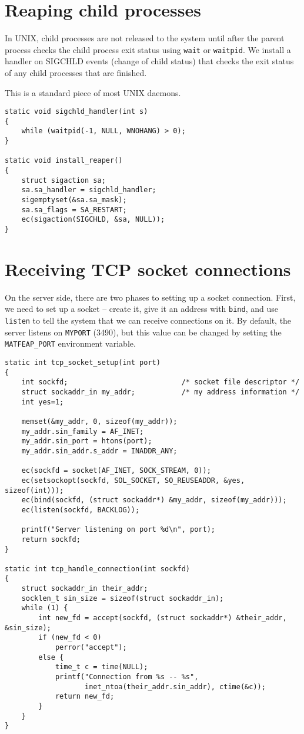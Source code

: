 \section{Reaping child processes}

In UNIX, child processes are not released to the system until after the
parent process checks the child process exit status using {\tt wait} or
{\tt waitpid}.  We install a handler on SIGCHLD events (change of child
status) that checks the exit status of any child processes that are 
finished.

This is a standard piece of most UNIX daemons.

\begin{verbatim}
static void sigchld_handler(int s)
{
    while (waitpid(-1, NULL, WNOHANG) > 0);
}

static void install_reaper()
{
    struct sigaction sa;
    sa.sa_handler = sigchld_handler;
    sigemptyset(&sa.sa_mask);
    sa.sa_flags = SA_RESTART;
    ec(sigaction(SIGCHLD, &sa, NULL));
}

\end{verbatim}
\section{Receiving TCP socket connections}

On the server side, there are two phases to setting up a socket connection.
First, we need to set up a socket -- create it, give it an address with
{\tt bind}, and use {\tt listen} to tell the system that we can receive
connections on it.  By default, the server listens on {\tt MYPORT} (3490),
but this value can be changed by setting the {\tt MATFEAP\_PORT} environment
variable.

\begin{verbatim}
static int tcp_socket_setup(int port)
{
    int sockfd;                           /* socket file descriptor */
    struct sockaddr_in my_addr;           /* my address information */
    int yes=1;

    memset(&my_addr, 0, sizeof(my_addr));
    my_addr.sin_family = AF_INET;
    my_addr.sin_port = htons(port);
    my_addr.sin_addr.s_addr = INADDR_ANY;

    ec(sockfd = socket(AF_INET, SOCK_STREAM, 0));
    ec(setsockopt(sockfd, SOL_SOCKET, SO_REUSEADDR, &yes, sizeof(int)));
    ec(bind(sockfd, (struct sockaddr*) &my_addr, sizeof(my_addr)));
    ec(listen(sockfd, BACKLOG));

    printf("Server listening on port %d\n", port);
    return sockfd;
}

static int tcp_handle_connection(int sockfd)
{
    struct sockaddr_in their_addr;
    socklen_t sin_size = sizeof(struct sockaddr_in);
    while (1) {
        int new_fd = accept(sockfd, (struct sockaddr*) &their_addr, &sin_size);
        if (new_fd < 0)
            perror("accept");
        else {
            time_t c = time(NULL);
            printf("Connection from %s -- %s",
                   inet_ntoa(their_addr.sin_addr), ctime(&c));
            return new_fd;
        }
    }
}

\end{verbatim}
